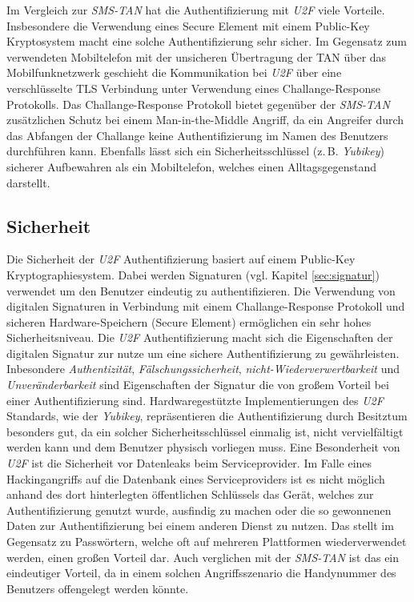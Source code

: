 \documentclass[11pt,a4paper,ngerman]{scrreprt}
\begin{document}
Im Vergleich zur \textit{SMS-TAN} hat die Authentifizierung mit \textit{U2F} viele Vorteile. Insbesondere die Verwendung eines Secure Element mit einem Public-Key Kryptosystem macht eine solche Authentifizierung sehr sicher. Im Gegensatz zum verwendeten Mobiltelefon mit der unsicheren Übertragung der TAN über das Mobilfunknetzwerk geschieht die Kommunikation bei \textit{U2F} über eine verschlüsselte TLS Verbindung unter Verwendung eines Challange-Response Protokolls. Das Challange-Response Protokoll bietet gegenüber der \textit{SMS-TAN} zusätzlichen Schutz bei einem Man-in-the-Middle Angriff, da ein Angreifer durch das Abfangen der Challange keine Authentifizierung im Namen des Benutzers durchführen kann. Ebenfalls lässt sich ein Sicherheitsschlüssel (z.\,B. \textit{Yubikey}) sicherer Aufbewahren als ein Mobiltelefon, welches einen Alltagsgegenstand darstellt.
\subsection{Sicherheit}
Die Sicherheit der \textit{U2F} Authentifizierung basiert auf einem Public-Key Kryptographiesystem. Dabei werden Signaturen (vgl. Kapitel \ref{sec:signatur}) verwendet um den Benutzer eindeutig zu authentifizieren. Die Verwendung von digitalen Signaturen in Verbindung mit einem Challange-Response Protokoll und sicheren Hardware-Speichern (Secure Element) ermöglichen ein sehr hohes Sicherheitsniveau. Die \textit{U2F} Authentifizierung macht sich die Eigenschaften der digitalen Signatur zur nutze um eine sichere Authentifizierung zu gewährleisten. Inbesondere \emph{Authentizität}, \emph{Fälschungssicherheit}, \emph{nicht-Wiederverwertbarkeit} und \emph{Unveränderbarkeit} sind Eigenschaften der Signatur die von großem Vorteil bei einer Authentifizierung sind. Hardwaregestützte Implementierungen des \textit{U2F} Standards, wie der \textit{Yubikey}, repräsentieren die Authentifizierung durch Besitztum besonders gut, da ein solcher Sicherheitsschlüssel einmalig ist, nicht vervielfältigt werden kann und dem Benutzer physisch vorliegen muss. Eine Besonderheit von \textit{U2F} ist die Sicherheit vor Datenleaks beim Serviceprovider. Im Falle eines Hackingangriffs auf die Datenbank eines Serviceproviders ist es nicht möglich anhand des dort hinterlegten öffentlichen Schlüssels das Gerät, welches zur Authentifizierung genutzt wurde, ausfindig zu machen oder die so gewonnenen Daten zur Authentifizierung bei einem anderen Dienst zu nutzen. Das stellt im Gegensatz zu Passwörtern, welche oft auf mehreren Plattformen wiederverwendet werden, einen großen Vorteil dar. Auch verglichen mit der \textit{SMS-TAN} ist das ein eindeutiger Vorteil, da in einem solchen Angriffsszenario die Handynummer des Benutzers offengelegt werden könnte.
\end{document}

